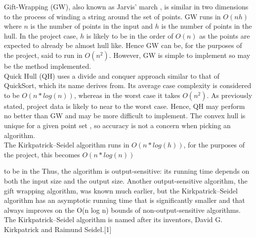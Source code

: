 Gift-Wrapping (GW), also known as Jarvis' march \cite{Jarvis1973}, is similar in two dimensions to the process of winding a string around the set of points. 
GW runs in $O(nh)$  \cite{Cormen2001} where $n$ is the number of points in the input and $h$ is the number of points in the hull. In the project case, $h$ is likely to be in the order of $O(n)$ as the points are expected to already be almost hull like. 
Hence GW can be, for the purposes of the project, said to run in $O(n^2)$. However, GW is simple to implement so may be the method implemented.\\

Quick Hull (QH) uses a divide and conquer approach similar to that of QuickSort, which its name derives from. 
Its average case complexity is considered to be $O(n * log(n))$, whereas in the worst case it takes $O(n^2)$.
As previously stated, project data is likely to near to the worst case.
Hence, QH may perform no better than GW and may be more difficult to implement.
The convex hull is unique for a given point set \cite{Sedgewick2012}, so accuracy is not a concern when picking an algorithm.\\

The Kirkpatrick–Seidel algorithm runs in $O(n*log(h))$, for the purposes of the project, this becomes $O(n*log(n))$

to be in the  Thus, the algorithm is output-sensitive: its running time depends on both the input size and the output size. Another output-sensitive algorithm, the gift wrapping algorithm, was known much earlier, but the Kirkpatrick–Seidel algorithm has an asymptotic running time that is significantly smaller and that always improves on the O(n log n) bounds of non-output-sensitive algorithms. The Kirkpatrick–Seidel algorithm is named after its inventors, David G. Kirkpatrick and Raimund Seidel.[1]


